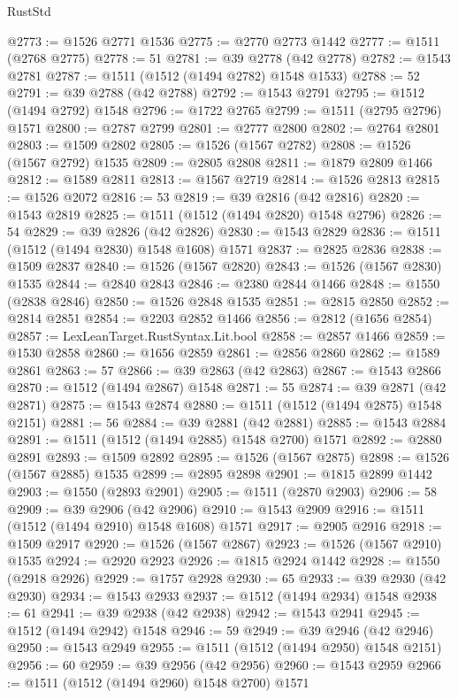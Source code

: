 \begin{lexlean}{RustStd}
\begin{coremodule}
{{@2773 := @1526 @2771 @1536
@2775 := @2770 @2773 @1442
@2777 := @1511 (@2768 @2775)
@2778 := 51
@2781 := @39 @2778 (@42 @2778)
@2782 := @1543 @2781
@2787 := @1511 (@1512 (@1494 @2782) @1548 @1533)
@2788 := 52
@2791 := @39 @2788 (@42 @2788)
@2792 := @1543 @2791
@2795 := @1512 (@1494 @2792) @1548
@2796 := @1722 @2765
@2799 := @1511 (@2795 @2796) @1571
@2800 := @2787 @2799
@2801 := @2777 @2800
@2802 := @2764 @2801
@2803 := @1509 @2802
@2805 := @1526 (@1567 @2782)
@2808 := @1526 (@1567 @2792) @1535
@2809 := @2805 @2808
@2811 := @1879 @2809 @1466
@2812 := @1589 @2811
@2813 := @1567 @2719
@2814 := @1526 @2813
@2815 := @1526 @2072
@2816 := 53
@2819 := @39 @2816 (@42 @2816)
@2820 := @1543 @2819
@2825 := @1511 (@1512 (@1494 @2820) @1548 @2796)
@2826 := 54
@2829 := @39 @2826 (@42 @2826)
@2830 := @1543 @2829
@2836 := @1511 (@1512 (@1494 @2830) @1548 @1608) @1571
@2837 := @2825 @2836
@2838 := @1509 @2837
@2840 := @1526 (@1567 @2820)
@2843 := @1526 (@1567 @2830) @1535
@2844 := @2840 @2843
@2846 := @2380 @2844 @1466
@2848 := @1550 (@2838 @2846)
@2850 := @1526 @2848 @1535
@2851 := @2815 @2850
@2852 := @2814 @2851
@2854 := @2203 @2852 @1466
@2856 := @2812 (@1656 @2854)
@2857 := LexLeanTarget.RustSyntax.Lit.bool
@2858 := @2857 @1466
@2859 := @1530 @2858
@2860 := @1656 @2859
@2861 := @2856 @2860
@2862 := @1589 @2861
@2863 := 57
@2866 := @39 @2863 (@42 @2863)
@2867 := @1543 @2866
@2870 := @1512 (@1494 @2867) @1548
@2871 := 55
@2874 := @39 @2871 (@42 @2871)
@2875 := @1543 @2874
@2880 := @1511 (@1512 (@1494 @2875) @1548 @2151)
@2881 := 56
@2884 := @39 @2881 (@42 @2881)
@2885 := @1543 @2884
@2891 := @1511 (@1512 (@1494 @2885) @1548 @2700) @1571
@2892 := @2880 @2891
@2893 := @1509 @2892
@2895 := @1526 (@1567 @2875)
@2898 := @1526 (@1567 @2885) @1535
@2899 := @2895 @2898
@2901 := @1815 @2899 @1442
@2903 := @1550 (@2893 @2901)
@2905 := @1511 (@2870 @2903)
@2906 := 58
@2909 := @39 @2906 (@42 @2906)
@2910 := @1543 @2909
@2916 := @1511 (@1512 (@1494 @2910) @1548 @1608) @1571
@2917 := @2905 @2916
@2918 := @1509 @2917
@2920 := @1526 (@1567 @2867)
@2923 := @1526 (@1567 @2910) @1535
@2924 := @2920 @2923
@2926 := @1815 @2924 @1442
@2928 := @1550 (@2918 @2926)
@2929 := @1757 @2928
@2930 := 65
@2933 := @39 @2930 (@42 @2930)
@2934 := @1543 @2933
@2937 := @1512 (@1494 @2934) @1548
@2938 := 61
@2941 := @39 @2938 (@42 @2938)
@2942 := @1543 @2941
@2945 := @1512 (@1494 @2942) @1548
@2946 := 59
@2949 := @39 @2946 (@42 @2946)
@2950 := @1543 @2949
@2955 := @1511 (@1512 (@1494 @2950) @1548 @2151)
@2956 := 60
@2959 := @39 @2956 (@42 @2956)
@2960 := @1543 @2959
@2966 := @1511 (@1512 (@1494 @2960) @1548 @2700) @1571
}}
\end{coremodule}
\end{lexlean}
